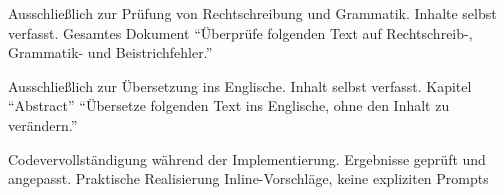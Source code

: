 
  {Ausschließlich zur Prüfung von Rechtschreibung und Grammatik. Inhalte selbst verfasst.}
  {Gesamtes Dokument}
  {\enquote{Überprüfe folgenden Text auf Rechtschreib-, Grammatik- und Beistrichfehler.}}

  {Ausschließlich zur Übersetzung ins Englische. Inhalt selbst verfasst.}
  {Kapitel \enquote{Abstract}}
  {\enquote{Übersetze folgenden Text ins Englische, ohne den Inhalt zu verändern.}}

  {Codevervollständigung während der Implementierung. Ergebnisse geprüft und angepasst.}
  {Praktische Realisierung}
  {Inline-Vorschläge, keine expliziten Prompts}
